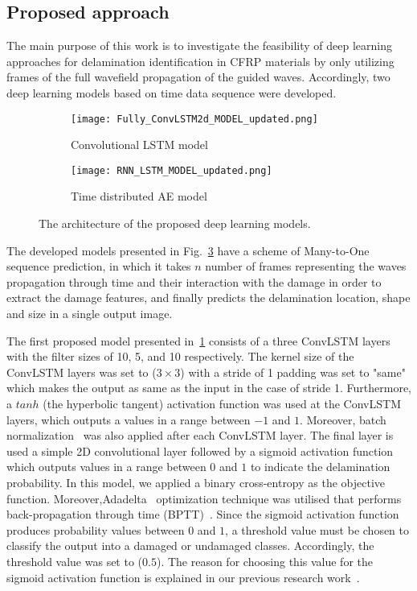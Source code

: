 \subsection{Proposed approach}
The main purpose of this work is to investigate the feasibility of deep learning approaches for delamination identification in CFRP materials by only utilizing frames of the full wavefield propagation of the guided waves.
Accordingly, two deep learning models based on time data sequence were developed.
\begin{figure} [!h]
	\centering
	\begin{subfigure}[b]{0.49\textwidth}
		\centering
		\texttt{[image: Fully\_ConvLSTM2d\_MODEL\_updated.png]}
		\caption{Convolutional LSTM model}
		\label{fig:convlstm_model}
	\end{subfigure}
	\hfill
	\begin{subfigure}[b]{0.49\textwidth}
		\centering
		\texttt{[image: RNN\_LSTM\_MODEL\_updated.png]}
		\caption{Time distributed AE model}
		\label{fig:AE_convlstm}
	\end{subfigure}
	\caption{The architecture of the proposed deep learning models.}
	\label{fig:proposed_models}
\end{figure} 

The developed models presented in Fig.~\ref{fig:proposed_models} have a scheme of Many-to-One sequence prediction, in which it takes \(n\) number of frames representing the waves propagation through time and their interaction with the damage in order to extract the damage features, and finally predicts the delamination location, shape and size in a single output image.

The first proposed model presented in~\ref{fig:convlstm_model} 
consists of a three ConvLSTM layers with the filter sizes of 10, 5, and 10 respectively.
The kernel size of the ConvLSTM layers was set to (\(3\times3\)) with a stride of 1 padding was set to "same" which makes the output as same as the input in the case of stride 1.
Furthermore, a \(tanh\) (the hyperbolic tangent) activation function was used at the ConvLSTM layers, which outputs a values in a range between \(-1\) and \(1\).
Moreover, batch normalization~\cite{Santurkar2018} was also applied after each ConvLSTM layer.  
The final layer is used a simple 2D convolutional layer followed by a sigmoid activation function which outputs values in a range between \(0\) and \(1\) to indicate the delamination probability.
In this model, we applied a binary cross-entropy as the objective function.
Moreover,Adadelta~\cite{zeiler2012adadelta} optimization technique was utilised that performs back-propagation through time (BPTT)~\cite{goodfellow2016deep}. 
Since the sigmoid activation function produces probability values between \(0\) and \(1\), a threshold value must be chosen to classify the output into a damaged or undamaged classes.
Accordingly, the threshold value was set to (\(0.5\)).
The reason for choosing this value for the sigmoid activation function is explained in our previous research work~\cite{ijjeh2021full}.

